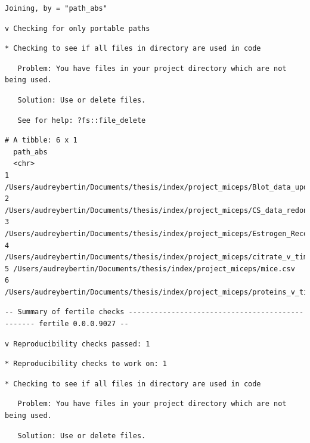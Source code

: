 \documentclass[12pt,twoside]{reedthesis}
\begin{document}
\begin{verbatim}
Joining, by = "path_abs"
\end{verbatim}
\begin{verbatim}
v Checking for only portable paths
\end{verbatim}
\begin{verbatim}
* Checking to see if all files in directory are used in code
\end{verbatim}
\begin{verbatim}
   Problem: You have files in your project directory which are not being used.
\end{verbatim}
\begin{verbatim}
   Solution: Use or delete files.
\end{verbatim}
\begin{verbatim}
   See for help: ?fs::file_delete
\end{verbatim}
\begin{verbatim}
# A tibble: 6 x 1
  path_abs                                                                      
  <chr>                                                                         
1 /Users/audreybertin/Documents/thesis/index/project_miceps/Blot_data_updated.c~
2 /Users/audreybertin/Documents/thesis/index/project_miceps/CS_data_redone.csv  
3 /Users/audreybertin/Documents/thesis/index/project_miceps/Estrogen_Receptors.~
4 /Users/audreybertin/Documents/thesis/index/project_miceps/citrate_v_time.png  
5 /Users/audreybertin/Documents/thesis/index/project_miceps/mice.csv            
6 /Users/audreybertin/Documents/thesis/index/project_miceps/proteins_v_time.png 
\end{verbatim}
\begin{verbatim}
-- Summary of fertile checks ------------------------------------------------ fertile 0.0.0.9027 --
\end{verbatim}
\begin{verbatim}
v Reproducibility checks passed: 1
\end{verbatim}
\begin{verbatim}
* Reproducibility checks to work on: 1
\end{verbatim}
\begin{verbatim}
* Checking to see if all files in directory are used in code
\end{verbatim}
\begin{verbatim}
   Problem: You have files in your project directory which are not being used.
\end{verbatim}
\begin{verbatim}
   Solution: Use or delete files.
\end{verbatim}
\end{document}
